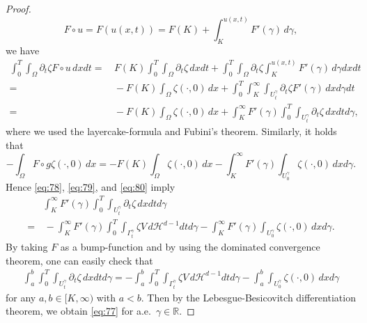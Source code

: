 \documentclass{amsart}
\theoremstyle{definition}
\def\R{{\mathbb{R}}}
\begin{document}
\begin{proof}
\[
F \circ u
=F (u(x,t))
=F (K) + \int _K ^{u(x,t)} F' (\gamma) \, d\gamma, 
\]
we have
\begin{equation}\label{eq:79}
\begin{split}
\int_0 ^T \int_\Omega
\partial_t \zeta F \circ u \, dxdt
= & \, 
F (K)
\int_0 ^T \int_\Omega
\partial_t \zeta \, dxdt
+\int_0 ^T \int _\Omega \partial_t \zeta\int_K ^{u(x,t)} F'(\gamma) \, d\gamma dxdt \\
=&\, -F (K) \int_\Omega \zeta(\cdot,0) \, dx
+ \int_ 0 ^T \int_ K ^\infty \int_{U_t ^\gamma} \partial_t \zeta F'(\gamma) \, dxd\gamma dt \\
=&\, -F (K) \int_\Omega \zeta(\cdot,0) \, dx
+ \int_ K ^\infty F'(\gamma) \int_ 0 ^T  \int_{U_t ^\gamma} \partial_t \zeta \, dx dt d\gamma, 
\end{split}
\end{equation}
where we used the layercake-formula and Fubini's theorem. Similarly, it holds that
\begin{equation}\label{eq:80}
- \int_\Omega F \circ g \zeta (\cdot,0) \, dx
=
- F (K) \int_\Omega \zeta (\cdot,0) \, dx
-\int_K ^\infty F' (\gamma) \int_{U_0 ^\gamma} \zeta (\cdot,0) \, dxd\gamma.
\end{equation}
Hence \eqref{eq:78}, \eqref{eq:79}, and \eqref{eq:80} imply
\begin{equation*}
\begin{split}
& \int_ K ^\infty F'(\gamma) \int_ 0 ^T  \int_{U_t ^\gamma} \partial_t \zeta \, dx dt d\gamma \\
= & \, 
-\int _K ^\infty F' (\gamma) \int_0 ^T \int_{\Gamma_t ^\gamma} \zeta V \, d\mathcal{H}^{d-1} dt d\gamma
-\int_K ^\infty F' (\gamma) \int_{U_0 ^\gamma} \zeta (\cdot,0) \, dxd\gamma .
\end{split}
\end{equation*}
By taking $F$ as a bump-function and by using the dominated convergence theorem, 
one can easily check that
\begin{equation*}
\begin{split}
\int_ a ^b \int_ 0 ^T  \int_{U_t ^\gamma} \partial_t \zeta \, dx dt d\gamma 
=  
-\int _a ^b \int_0 ^T \int_{\Gamma_t ^\gamma} \zeta V \, d\mathcal{H}^{d-1} dt d\gamma
-\int_a ^b \int_{U_0 ^\gamma} \zeta (\cdot,0) \, dxd\gamma
\end{split}
\end{equation*}
for any $a,b \in [K,\infty)$ with $a<b$.
Then by the Lebesgue-Besicovitch differentiation theorem, we obtain \eqref{eq:77} for a.e.\ $\gamma \in \R$.


\end{proof}
\end{document}
